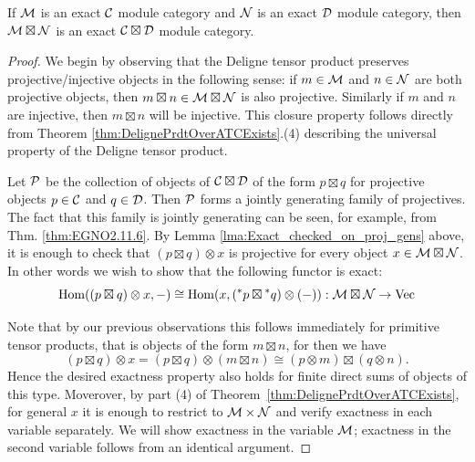\documentclass{amsart}
\begin{document}
\begin{theorem}\label{thm:tensor-exactness}
If $\mathcal M$ is an exact $\mathcal C$ module category and $\mathcal N$ is an exact $\mathcal D$ module category, then $\mathcal M \boxtimes \mathcal N$ is an exact $\mathcal C \boxtimes \mathcal D$ module category.
\end{theorem} %
\begin{proof}
We begin by observing that the Deligne tensor product preserves projective/injective objects in the following sense: if $m \in \mathcal M$ and $n \in \mathcal N$ are both projective objects, then $m \boxtimes n \in \mathcal M \boxtimes \mathcal N$ is also projective. Similarly if $m$ and $n$ are injective, then $m \boxtimes n$ will be injective. This closure property follows directly from Theorem \ref{thm:DelignePrdtOverATCExists}.(4) describing the universal property of the Deligne tensor product. 	
	
Let $\mathcal P$ be the collection of objects of $\mathcal C \boxtimes \mathcal D$ of the form $p \boxtimes q$ for projective objects $p \in \mathcal C$ and $q \in \mathcal D$. Then $\mathcal P$ forms a jointly generating family of projectives. The fact that this family is jointly generating can be seen, for example, from Thm. \ref{thm:EGNO2.11.6}. By Lemma \ref{lma:Exact_checked_on_proj_gens} above, it is enough to check that $(p \boxtimes q) \otimes x$ is projective for every object $x \in \mathcal M \boxtimes \mathcal N$. In other words we wish to show that the following functor is exact:
\begin{equation*}
	\operatorname{Hom}((p \boxtimes q) \otimes x, -) \cong \operatorname{Hom}(x, ({}^*p \boxtimes {}^*q) \otimes(-) ): \mathcal M \boxtimes \mathcal N \to \mathrm{Vec}
\end{equation*}

Note that by our previous observations this follows immediately for primitive tensor products, that is 
 objects of the form $ m \boxtimes n$, for then we have
\begin{equation*}
	(p \boxtimes q) \otimes x = (p \boxtimes q) \otimes (m \boxtimes n) \cong (p \otimes m) \boxtimes (q \otimes n).
\end{equation*}
Hence the desired exactness property also holds for finite direct sums of objects of this type. Moverover, by part (4) of Theorem~\ref{thm:DelignePrdtOverATCExists}, for general $x$ it is enough to restrict to $\mathcal M \times \mathcal N$ and 
verify exactness in each variable separately. We will show exactness in the variable $\mathcal M$; exactness in the second variable follows from an identical argument. 


\end{proof}
\end{document}
